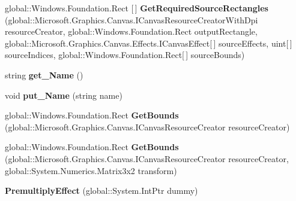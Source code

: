 \begin{DoxyCompactItemize}
global\+::\+Windows.\+Foundation.\+Rect \mbox{[}$\,$\mbox{]} {\bfseries Get\+Required\+Source\+Rectangles} (global\+::\+Microsoft.\+Graphics.\+Canvas.\+I\+Canvas\+Resource\+Creator\+With\+Dpi resource\+Creator, global\+::\+Windows.\+Foundation.\+Rect output\+Rectangle, global\+::\+Microsoft.\+Graphics.\+Canvas.\+Effects.\+I\+Canvas\+Effect\mbox{[}$\,$\mbox{]} source\+Effects, uint\mbox{[}$\,$\mbox{]} source\+Indices, global\+::\+Windows.\+Foundation.\+Rect\mbox{[}$\,$\mbox{]} source\+Bounds)
\item 
\mbox{\label{class_microsoft_1_1_graphics_1_1_canvas_1_1_effects_1_1_premultiply_effect_ab9deb479410abba643b6a4e1650bc048}} 
string {\bfseries get\+\_\+\+Name} ()
\item 
\mbox{\label{class_microsoft_1_1_graphics_1_1_canvas_1_1_effects_1_1_premultiply_effect_ae2c6e17d6ad14c7d19658f450781811a}} 
void {\bfseries put\+\_\+\+Name} (string name)
\item 
\mbox{\label{class_microsoft_1_1_graphics_1_1_canvas_1_1_effects_1_1_premultiply_effect_a47fdc5928f2f49a98c50255a72422ff2}} 
global\+::\+Windows.\+Foundation.\+Rect {\bfseries Get\+Bounds} (global\+::\+Microsoft.\+Graphics.\+Canvas.\+I\+Canvas\+Resource\+Creator resource\+Creator)
\item 
\mbox{\label{class_microsoft_1_1_graphics_1_1_canvas_1_1_effects_1_1_premultiply_effect_a947b24f370b9b36c3b160ab2faa72fcd}} 
global\+::\+Windows.\+Foundation.\+Rect {\bfseries Get\+Bounds} (global\+::\+Microsoft.\+Graphics.\+Canvas.\+I\+Canvas\+Resource\+Creator resource\+Creator, global\+::\+System.\+Numerics.\+Matrix3x2 transform)
\item 
\mbox{\label{class_microsoft_1_1_graphics_1_1_canvas_1_1_effects_1_1_premultiply_effect_a8186cf7bd26fe373a3ab0216db4f0f3a}} 
{\bfseries Premultiply\+Effect} (global\+::\+System.\+Int\+Ptr dummy)
\item 
\mbox{\label{class_microsoft_1_1_graphics_1_1_canvas_1_1_effects_1_1_premultiply_effect_a5fc45f472f6b09a3d1441141d658dbce}} 

\end{DoxyCompactItemize}
